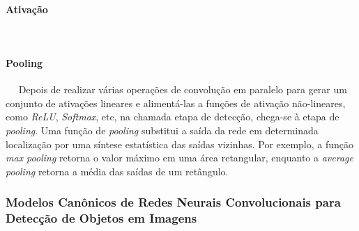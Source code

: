 \paragraph{Ativação}
\ \ \newline

\paragraph{Pooling}
\ \ \newline
Depois de realizar várias operações de convolução em paralelo para gerar um conjunto de ativações lineares e alimentá-las a funções de ativação não-lineares, como \emph{ReLU}, \emph{Softmax}, etc, na chamada etapa de detecção, chega-se à etapa de \emph{pooling}. Uma função de \emph{pooling} substitui a saída da rede em determinada localização por uma síntese estatística das saídas vizinhas. Por exemplo, a função \emph{max pooling} retorna o valor máximo em uma área retangular, enquanto a \emph{average pooling} retorna a média das saídas de um retângulo. %


\subsubsection{Modelos Canônicos de Redes Neurais Convolucionais para Detecção de Objetos em Imagens} \label{subsubsec:modelos_canonicos}

